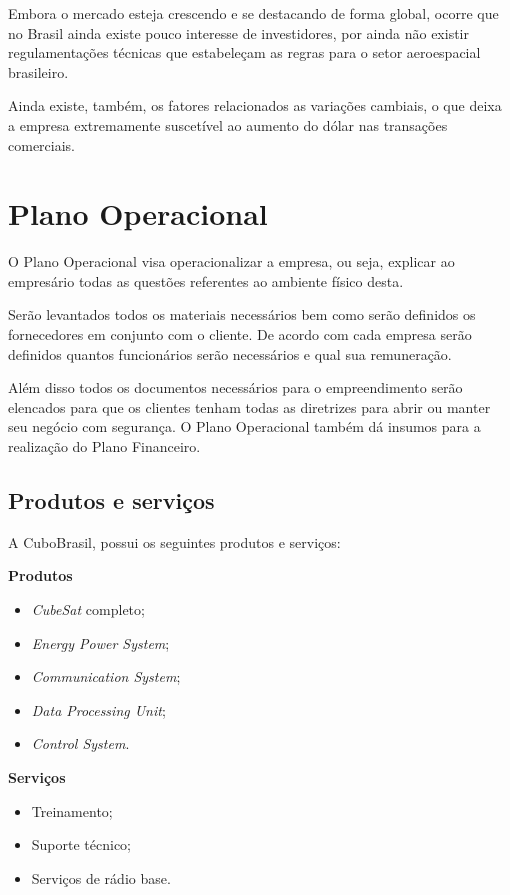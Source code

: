 \documentclass[
	12pt,				%
	openright,			%
	oneside,			%
	a4paper,			%
	english,			%
	french,				%
	spanish,			%
	brazil				%
	]{abntex2}
\begin{document}
	Embora o mercado esteja crescendo e se destacando de forma global, ocorre que no Brasil ainda existe pouco interesse de investidores, por ainda não existir regulamentações técnicas que estabeleçam as regras para o setor aeroespacial brasileiro.
	
	Ainda existe, também, os fatores relacionados as variações cambiais, o que deixa a empresa extremamente suscetível ao aumento do dólar nas transações comerciais.
	
\chapter[Plano Operacional]{Plano Operacional}

	O Plano Operacional visa operacionalizar a empresa, ou seja, explicar ao empresário todas as questões referentes ao ambiente físico desta.
 
	Serão levantados todos os materiais necessários bem como serão definidos os fornecedores em conjunto com o cliente. De acordo com cada empresa serão definidos quantos funcionários serão necessários e qual sua remuneração.
 
	Além disso todos os documentos necessários para o empreendimento serão elencados para que os clientes tenham todas as diretrizes para abrir ou manter seu negócio com segurança. O Plano Operacional também dá insumos para a realização do Plano Financeiro.

\section[Produtos e serviços]{Produtos e serviços}

	A CuboBrasil, possui os seguintes produtos e serviços:
	
	\textbf{Produtos}
	\begin{itemize}
		\item \textit{CubeSat} completo;
		\item \textit{Energy Power System};
		\item \textit{Communication System};
		\item \textit{Data Processing Unit};
		\item \textit{Control System}.
	\end{itemize}

	\textbf{Serviços}
	\begin{itemize}
		\item Treinamento;
		\item Suporte técnico;
		\item Serviços de rádio base.
	\end{itemize}
\end{document}
